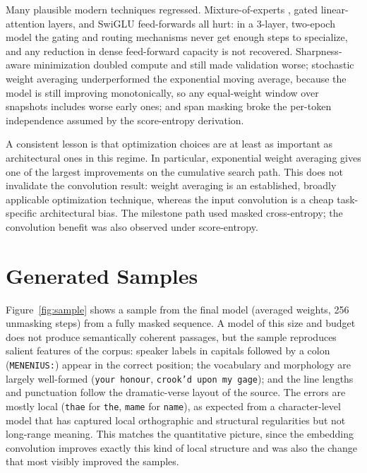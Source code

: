 \documentclass[11pt]{article}
\begin{document}
Many plausible modern techniques regressed. Mixture-of-experts
\citep{shazeer2017moe}, gated linear-attention layers, and SwiGLU feed-forwards
\citep{shazeer2020glu} all hurt: in a 3-layer, two-epoch model the gating and
routing mechanisms never get enough steps to specialize, and any reduction in
dense feed-forward capacity is not recovered. Sharpness-aware minimization
\citep{foret2021sam} doubled compute and still made validation worse; stochastic
weight averaging \citep{izmailov2018swa} underperformed the exponential moving
average, because the model is still improving monotonically, so any equal-weight
window over snapshots includes worse early ones; and span masking broke the
per-token independence assumed by the score-entropy derivation. 

A consistent lesson is that optimization choices are at least as important as architectural ones in this regime. In particular, exponential weight averaging gives one of the largest improvements on the cumulative search path. This does not invalidate the convolution result: weight averaging is an established, broadly applicable optimization technique, whereas the input convolution is a cheap task-specific architectural bias. The milestone path used masked cross-entropy; the convolution benefit was also observed under score-entropy.

\section{Generated Samples}
\label{sec:samples}

Figure~\ref{fig:sample} shows a sample from the final model (averaged weights,
256 unmasking steps) from a fully masked sequence. A model of this size and
budget does not produce semantically coherent passages, but the sample reproduces
salient features of the corpus: speaker labels in capitals followed by a colon
(\texttt{MENENIUS:}) appear in the correct position; the vocabulary and
morphology are largely well-formed (\texttt{your honour},
\texttt{crook'd upon my gage}); and the line lengths and punctuation follow the
dramatic-verse layout of the source. The errors are mostly local
(\texttt{thae} for \texttt{the}, \texttt{mame} for \texttt{name}), as expected
from a character-level model that has captured local orthographic and structural
regularities but not long-range meaning. This matches the quantitative picture,
since the embedding convolution improves exactly this kind of local structure and
was also the change that most visibly improved the samples.
\end{document}
